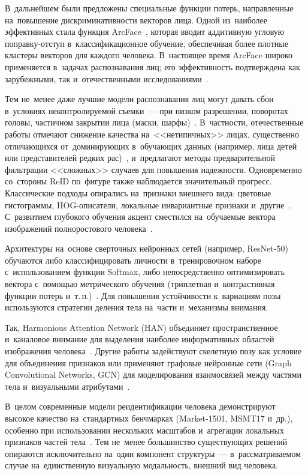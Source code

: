 В~дальнейшем были предложены специальные функции потерь, направленные
на~повышение дискриминативности векторов лица. Одной из~наиболее
эффективных стала функция ArcFace~\cite{Deng2019arcface}, которая
вводит аддитивную угловую поправку-отступ в~классификационное обучение,
обеспечивая более плотные кластеры векторов для каждого человека.
В~настоящее время ArcFace широко применяется в~задачах распознавания
лиц; его эффективность подтверждена как зарубежными, так
и~отечественными исследованиями~\cite{Mubinova2024face}.

Тем не~менее даже лучшие модели распознавания лиц могут давать сбои
в~условиях неконтролируемой съемки~--- при низком разрешении,
поворотах головы, частичном закрытии лица (маски,
шарфы)~\cite{Mubinova2024face}. В~частности, отечественные работы
отмечают снижение качества на~<<нетипичных>> лицах, существенно
отличающихся от~доминирующих в~обучающих данных (например, лица детей
или представителей редких рас)~\cite{Sokolova2022face}, и~предлагают
методы предварительной фильтрации <<сложных>> случаев для повышения
надежности. Одновременно со~стороны ReID по~фигуре также наблюдается
значительный прогресс. Классические подходы опирались на~признаки
внешнего вида: цветовые гистограммы, HOG-описатели, локальные
инвариантные признаки и~другие~\cite{Khachumov2015face}. С~развитием
глубокого обучения акцент сместился на~обучаемые вектора изображений
полноростового человека~\cite{Vezzani2013reidsurvey}.

Архитектуры на~основе сверточных нейронных сетей (например, ResNet-50)
обучаются либо классифицировать личности в~тренировочном наборе
с~использованием функции Softmax, либо непосредственно оптимизировать
вектора с~помощью метрического обучения (триплетная и~контрастивная
функции потерь и~т.\,п.)~\cite{Hermans2017triplet}. Для повышения устойчивости
к~вариациям позы используются стратегии деления тела на~части
и~механизмы внимания.

Так, Harmonious Attention Network (HAN) объединяет пространственное
и~каналовое внимание для выделения наиболее информативных областей
изображения человека~\cite{LiW2018harmonious}. Другие работы
задействуют скелетную позу как условие для объединения признаков или
применяют графовые нейронные сети (Graph Convolutional Networks, GCN)
для моделирования взаимосвязей между частями тела и~визуальными
атрибутами~\cite{Liao2023mmmgcn}.

В~целом современные модели реидентификации человека демонстрируют
высокое качество на~стандартных бенчмарках (Market-1501, MSMT17 и~др.),
особенно при использовании нескольких масштабов и~агрегации локальных
признаков частей тела~\cite{Ignatyeva2024reid}. Тем не~менее
большинство существующих решений опираются исключительно на~один
компонент структуры~--- в~рассматриваемом случае на~единственную
визуальную модальность, внешний вид человека.

